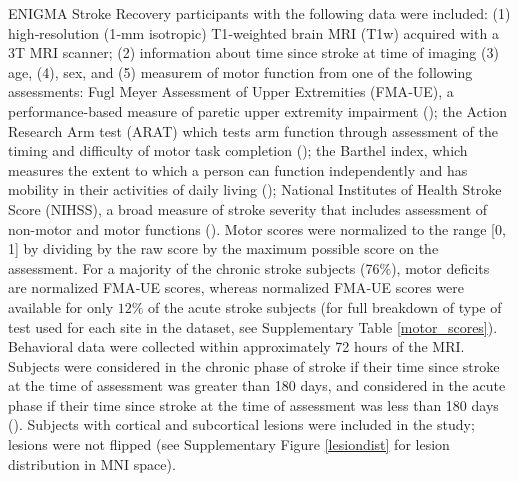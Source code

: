 \documentclass[10pt]{article}
\begin{document}
ENIGMA Stroke Recovery participants with the following data were included: (1) high‐resolution (1‐mm isotropic) T1‐weighted brain MRI (T1w) acquired with a 3T MRI scanner; (2) information about time since stroke at time of imaging (3) age, (4), sex, and (5) measurem of motor function from one of the following assessments: Fugl Meyer Assessment of Upper Extremities (FMA‐UE), a performance-based measure of paretic upper extremity impairment (\cite{Gladstone2002-fw}); the Action Research Arm test (ARAT) which tests arm function through assessment of the timing and difficulty of motor task completion (\cite{Yozbatiran2008-xv}); the Barthel index, which measures the extent to which a person can function independently and has mobility in their activities of daily living (\cite{Sulter1999-rr}); National Institutes of Health Stroke Score (NIHSS), a broad measure of stroke severity that includes assessment of non-motor and motor functions (\cite{Lyden2017-za}). Motor scores were normalized to the range [0, 1] by dividing by the raw score by the maximum possible score on the assessment. For a majority of the chronic stroke subjects (76$\%$), motor deficits are normalized FMA‐UE scores, whereas  normalized FMA‐UE scores were available for only $12\%$ of the acute stroke subjects (for full breakdown of type of test used for each site in the dataset, see Supplementary Table \ref{motor_scores}). Behavioral data were collected within approximately 72 hours of the MRI. Subjects were considered in the chronic phase of stroke if their time since stroke at the time of assessment was greater than 180 days, and considered in the acute phase if their time since stroke at the time of assessment was less than 180 days (\cite{Bernhardt2017-av}). Subjects with cortical and subcortical lesions were included in the study; lesions were not flipped (see Supplementary Figure \ref{lesiondist} for lesion distribution in MNI space). 
\end{document}
